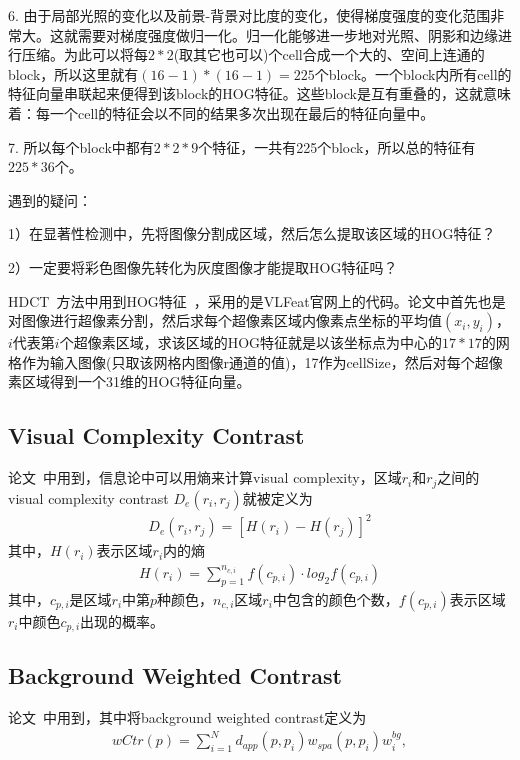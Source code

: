 \documentclass[12pt]{article}
\begin{document}
6. 由于局部光照的变化以及前景-背景对比度的变化，使得梯度强度的变化范围非常大。这就需要对梯度强度做归一化。归一化能够进一步地对光照、阴影和边缘进行压缩。为此可以将每$2*2$(取其它也可以)个cell合成一个大的、空间上连通的block，所以这里就有$(16-1)*(16-1) = 225$个block。一个block内所有cell的特征向量串联起来便得到该block的HOG特征。这些block是互有重叠的，这就意味着：每一个cell的特征会以不同的结果多次出现在最后的特征向量中。

7. 所以每个block中都有$2*2*9$个特征，一共有225个block，所以总的特征有$225*36$个。

遇到的疑问：

1）在显著性检测中，先将图像分割成区域，然后怎么提取该区域的HOG特征？

2）一定要将彩色图像先转化为灰度图像才能提取HOG特征吗？

HDCT~\cite{kim2014salient}方法中用到HOG特征~\cite{felzenszwalb2010object}，采用的是VLFeat官网上的代码。论文中首先也是对图像进行超像素分割，然后求每个超像素区域内像素点坐标的平均值$(x_i, y_i)$，$i$代表第$i$个超像素区域，求该区域的HOG特征就是以该坐标点为中心的$17*17$的网格作为输入图像(只取该网格内图像r通道的值)，17作为cellSize，然后对每个超像素区域得到一个31维的HOG特征向量。

\subsection{Visual Complexity Contrast}

论文~\cite{zhu2014tag}中用到，信息论中可以用熵来计算visual complexity，区域$r_i$和$r_j$之间的visual complexity contrast $D_e(r_i, r_j)$就被定义为
\begin{align}
D_e(r_i, r_j) = [H(r_i)-H(r_j)]^2
\end{align}
其中，$H(r_i)$表示区域$r_i$内的熵
\begin{align}
H(r_i) = \sum_{p=1}^{n_{c, i}}f(c_{p, i})\cdot log_2f(c_{p, i})
\end{align}
其中，$c_{p, i}$是区域$r_i$中第$p$种颜色，$n_{c, i}$区域$r_i$中包含的颜色个数，$f(c_{p, i})$表示区域$r_i$中颜色$c_{p, i}$出现的概率。

\subsection{Background Weighted Contrast}

论文~\cite{zhu2014saliency}中用到，其中将background weighted contrast定义为
\begin{align}
wCtr(p) = \sum_{i=1}^{N}d_{app}(p, p_i)w_{spa}(p, p_i)w_i^{bg},
\end{align}
\end{document}

